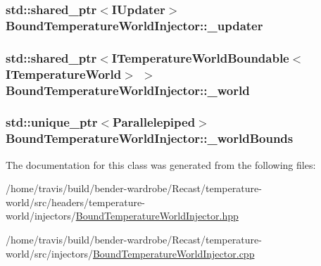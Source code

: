 \hypertarget{class_bound_temperature_world_injector_a1e6c06b5c8ecafe011f27fa69072751e}{
\subsubsection[{\-\_\-updater}]{\setlength{\rightskip}{0pt plus 5cm}std\-::shared\-\_\-ptr$<${\bf I\-Updater}$>$ Bound\-Temperature\-World\-Injector\-::\-\_\-updater\hspace{0.3cm}{\ttfamily [protected]}}}\label{class_bound_temperature_world_injector_a1e6c06b5c8ecafe011f27fa69072751e}
\hypertarget{class_bound_temperature_world_injector_a5917901f6697587dd6dd05b3f1fd0549}{
\subsubsection[{\-\_\-world}]{\setlength{\rightskip}{0pt plus 5cm}std\-::shared\-\_\-ptr$<${\bf I\-Temperature\-World\-Boundable}$<${\bf I\-Temperature\-World}$>$ $>$ Bound\-Temperature\-World\-Injector\-::\-\_\-world\hspace{0.3cm}{\ttfamily [protected]}}}\label{class_bound_temperature_world_injector_a5917901f6697587dd6dd05b3f1fd0549}
\hypertarget{class_bound_temperature_world_injector_a99e1aa88a9e38bddb58c22b030a126c3}{
\subsubsection[{\-\_\-world\-Bounds}]{\setlength{\rightskip}{0pt plus 5cm}std\-::unique\-\_\-ptr$<${\bf Parallelepiped}$>$ Bound\-Temperature\-World\-Injector\-::\-\_\-world\-Bounds\hspace{0.3cm}{\ttfamily [protected]}}}\label{class_bound_temperature_world_injector_a99e1aa88a9e38bddb58c22b030a126c3}


The documentation for this class was generated from the following files\-:\begin{DoxyCompactItemize}
\item 
/home/travis/build/bender-\/wardrobe/\-Recast/temperature-\/world/src/headers/temperature-\/world/injectors/\hyperlink{_bound_temperature_world_injector_8hpp}{Bound\-Temperature\-World\-Injector.\-hpp}\item 
/home/travis/build/bender-\/wardrobe/\-Recast/temperature-\/world/src/injectors/\hyperlink{_bound_temperature_world_injector_8cpp}{Bound\-Temperature\-World\-Injector.\-cpp}\end{DoxyCompactItemize}
